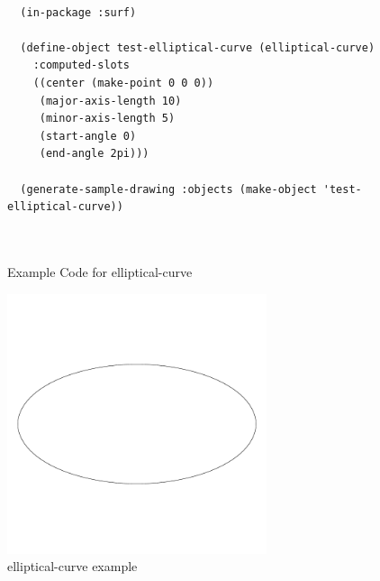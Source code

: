 \documentclass [11pt]{book}
\begin{document}
\begin{itemize}
\begin{description}
\end{description}




\begin{figure}
\begin{lrbox}{\boxedverb}
\begin{minipage}{\linewidth}
{\small

\begin{verbatim}

  (in-package :surf)

  (define-object test-elliptical-curve (elliptical-curve)
    :computed-slots
    ((center (make-point 0 0 0)) 
     (major-axis-length 10) 
     (minor-axis-length 5) 
     (start-angle 0) 
     (end-angle 2pi)))
  
  (generate-sample-drawing :objects (make-object 'test-elliptical-curve))



\end{verbatim}}
\end{minipage}
\end{lrbox}
\fbox{\usebox{\boxedverb}}

\caption{Example Code for elliptical-curve}

\label{fig:example-code-elliptical-curve}

\end{figure}

\begin{figure}
\begin{center}
\includegraphics[width=3in,height=3in]{../images/example-elliptical-curve.pdf}
\end{center}

\caption{elliptical-curve example}

\label{fig:elliptical-curve}


\end{figure}
\end{itemize}
\end{document}
